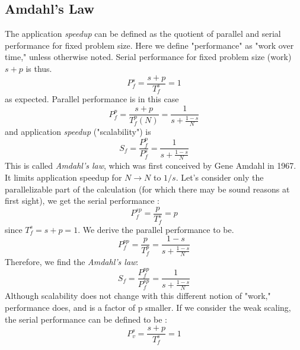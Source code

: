 \subsection{Amdahl's Law}
The application \textit{speedup} can be defined as the quotient of parallel and serial performance for fixed problem size. Here we define "performance" as "work over time," unless otherwise noted. Serial performance for fixed problem size (work) $s+ p$ is thus.
\begin{equation}
P_{f}^{s} =  \frac{s+p}{T_{f}^{s}}  = 1
\end{equation}
as expected. Parallel performance is in this case
\begin{equation}
P_{f}^{p} =  \frac{s+p}{T_{f}^{p}(N)}  = \frac{1}{s + \frac{1-s}{N}}
\end{equation}
and application \textit{speedup} ("scalability") is
\begin{equation}
S_{f} =  \frac{P_{f}^{p}}{P_{f}^{s}}  = \frac{1}{s + \frac{1-s}{N}}
\end{equation}
This is called \textit{Amdahl's law}, which was first conceived by Gene Amdahl in 1967. It limits application speedup for $N \rightarrow N $ to $1/s$.
Let's consider only the parallelizable part of the calculation (for which there may be sound reasons at first sight), we get the serial performance :
\begin{equation}
P_{f}^{sp} =  \frac{p}{T_{f}^{s}}  = p
\end{equation} 
since $T_{f}^{s} = s+p = 1$. We derive the parallel performance to be.
\begin{equation}
P_{f}^{pp} =  \frac{p}{T_{f}^{p}}  = \frac{1-s}{s + \frac{1-s}{N}}
\end{equation}
Therefore, we find the \textit{Amdahl's law}:
\begin{equation}
S_{f} =  \frac{P_{f}^{pp}}{P_{f}^{sp}} = \frac{1}{s + \frac{1-s}{N}}
\end{equation}
Although scalability does not change with this different notion of "work," performance does, and is a factor of p smaller.
If we consider the weak scaling, the serial performance can be defined to be :
\begin{equation}
P_{v}^{s} =  \frac{s+p}{T_{f}^{s}}  = 1
\end{equation}

